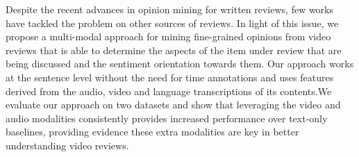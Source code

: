 Despite the recent advances in opinion mining for written reviews, few works have tackled the problem on other sources of reviews. In light of this issue, we propose a multi-modal approach for mining fine-grained opinions from video reviews that is able to determine the aspects of the item under review that are being discussed and the sentiment orientation towards them. Our approach works at the sentence level without the need for time annotations and uses features derived from the audio, video and language transcriptions of its contents.We evaluate our approach on two datasets and show that leveraging the video and audio modalities consistently provides increased performance over text-only baselines, providing evidence these extra modalities are key in better understanding video reviews.
